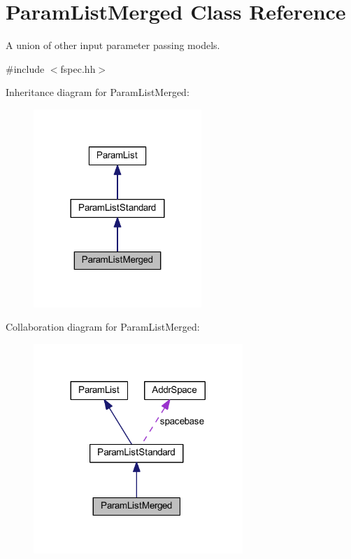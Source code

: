 \hypertarget{class_param_list_merged}{}\section{Param\+List\+Merged Class Reference}
\label{class_param_list_merged}


A union of other input parameter passing models.  




{\ttfamily \#include $<$fspec.\+hh$>$}



Inheritance diagram for Param\+List\+Merged\+:
\nopagebreak
\begin{figure}[H]
\begin{center}
\leavevmode
\includegraphics[width=180pt]{class_param_list_merged__inherit__graph}
\end{center}
\end{figure}


Collaboration diagram for Param\+List\+Merged\+:
\nopagebreak
\begin{figure}[H]
\begin{center}
\leavevmode
\includegraphics[width=224pt]{class_param_list_merged__coll__graph}
\end{center}
\end{figure}

